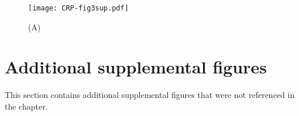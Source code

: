 \begin{figure}
	\centering
	\texttt{[image: CRP-fig3sup.pdf]}
	\caption{ 
		(A) 
	}
	\label{fig:CRP:fig3sup}
\end{figure}



\FloatBarrier
\clearpage
\section*{Additional supplemental figures}

This section contains additional supplemental figures that were not referenced in the chapter.

